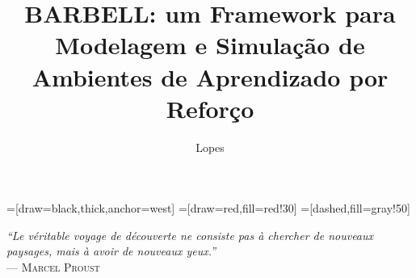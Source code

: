 \documentclass[cic,tc]{iiufrgs}
\title{BARBELL: um Framework para Modelagem e Simulação de Ambientes de Aprendizado por Reforço}
\author{Lopes}{Henrique de Paula}
\newcommand\bruno[1]{\textcolor{magenta}{#1}}
\begin{document}
\newenvironment{code}{\captionsetup{type=listing}}{}


=[draw=black,thick,anchor=west]
=[draw=red,fill=red!30]
=[dashed,fill=gray!50]
\maketitle

\clearpage
\begin{flushright}
    \mbox{}\vfill
    {\sffamily\itshape
      ``Le véritable voyage de découverte ne consiste pas à chercher de nouveaux paysages,
      mais à avoir de nouveaux yeux.''\\}
    --- \textsc{Marcel Proust}
\end{flushright}


\end{document}

